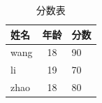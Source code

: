 \documentclass{ctexart}
\begin{document}
	\begin{table}[htbp]	%
		\centering
		\begin{tabular}{l || c | p{1.5cm}}%
			\hline	%
			姓名 & 年龄 & 分数\\
			\hline	\hline	%
			wang & 18 & 90\\
			li & 19 & 70\\
			zhao & 18 & 80\\
			\hline	%
		\end{tabular}
		\caption{分数表}	%
		\label{table_01}	%
	\end{table}
	
	
	
\end{document}
